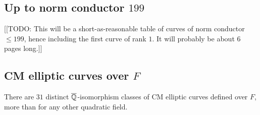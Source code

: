 \documentclass{amsart}
\begin{document}
\subsection{Up to norm conductor  $199$}\label{sec:to199}

[[TODO: This will be a short-as-reasonable table of curves of norm
conductor $\leq 199$, hence including the first curve of rank $1$.  It
will probably be about 6 pages long.]]

\subsection{CM elliptic curves over $F$}\label{sec:cm}

There are $31$ distinct $\overline{\mathbb{Q}}$-isomorphism classes of CM elliptic
curves defined over $F$, more than for any other
quadratic field.
\end{document}
